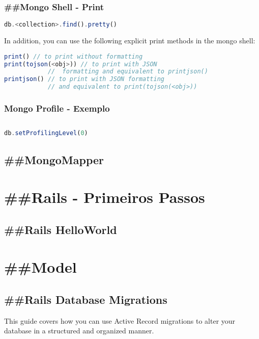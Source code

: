 \documentclass[serif,mathserif]{article}
\begin{document}
\subsubsection{\#\#Mongo Shell - Print}
\begin{lstlisting}[language=Javascript]
db.<collection>.find().pretty()
\end{lstlisting}

In addition, you can use the following explicit print methods in the mongo shell:
\begin{lstlisting}[language=Javascript]
print() // to print without formatting
print(tojson(<obj>)) // to print with JSON 
            //  formatting and equivalent to printjson()
printjson() // to print with JSON formatting
            // and equivalent to print(tojson(<obj>))
\end{lstlisting}


\subsubsection{Mongo Profile - Exemplo}
\begin{lstlisting}[language=Javascript]

\end{lstlisting}


\begin{lstlisting}[language=Javascript]
db.setProfilingLevel(0)
\end{lstlisting}



\subsection{\#\#MongoMapper}



\section{\#\#Rails - Primeiros Passos}

\subsection{\#\#Rails HelloWorld}

\section{\#\#Model}

\subsection{\#\#Rails Database Migrations}
This guide covers how you can use Active Record migrations to alter your database in a structured and organized manner.
\end{document}
